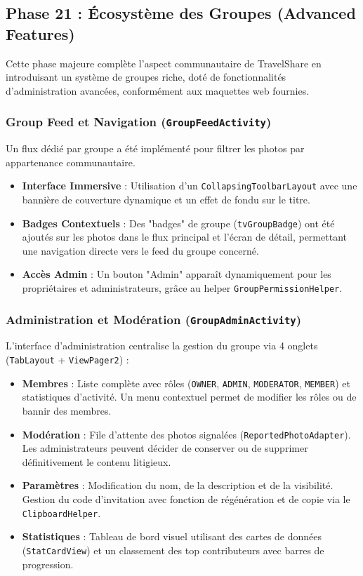 \documentclass{article}
\begin{document}
\subsection{Phase 21 : Écosystème des Groupes (Advanced Features)}
Cette phase majeure complète l'aspect communautaire de TravelShare en introduisant un système de groupes riche, doté de fonctionnalités d'administration avancées, conformément aux maquettes web fournies.

\subsubsection{Group Feed et Navigation (\texttt{GroupFeedActivity})}
Un flux dédié par groupe a été implémenté pour filtrer les photos par appartenance communautaire.
\begin{itemize}
    \item \textbf{Interface Immersive} : Utilisation d'un \texttt{CollapsingToolbarLayout} avec une bannière de couverture dynamique et un effet de fondu sur le titre.
    \item \textbf{Badges Contextuels} : Des "badges" de groupe (\texttt{tvGroupBadge}) ont été ajoutés sur les photos dans le flux principal et l'écran de détail, permettant une navigation directe vers le feed du groupe concerné.
    \item \textbf{Accès Admin} : Un bouton "Admin" apparaît dynamiquement pour les propriétaires et administrateurs, grâce au helper \texttt{GroupPermissionHelper}.
\end{itemize}

\subsubsection{Administration et Modération (\texttt{GroupAdminActivity})}
L'interface d'administration centralise la gestion du groupe via 4 onglets (\texttt{TabLayout} + \texttt{ViewPager2}) :
\begin{itemize}
    \item \textbf{Membres} : Liste complète avec rôles (\texttt{OWNER}, \texttt{ADMIN}, \texttt{MODERATOR}, \texttt{MEMBER}) et statistiques d'activité. Un menu contextuel permet de modifier les rôles ou de bannir des membres.
    \item \textbf{Modération} : File d'attente des photos signalées (\texttt{ReportedPhotoAdapter}). Les administrateurs peuvent décider de conserver ou de supprimer définitivement le contenu litigieux.
    \item \textbf{Paramètres} : Modification du nom, de la description et de la visibilité. Gestion du code d'invitation avec fonction de régénération et de copie via le \texttt{ClipboardHelper}.
    \item \textbf{Statistiques} : Tableau de bord visuel utilisant des cartes de données (\texttt{StatCardView}) et un classement des top contributeurs avec barres de progression.
\end{itemize}
\end{document}
